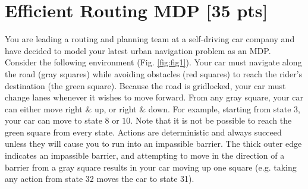 
\section{Efficient Routing MDP [35 pts]}

You are leading a routing and planning team at a self-driving car company and have decided to model your latest urban navigation problem as an MDP. Consider the following environment (Fig. \ref{fig:fig1}). Your car must navigate along the road (gray squares) while avoiding obstacles (red squares) to reach the rider's destination (the green square). Because the road is gridlocked, your car must change lanes whenever it wishes to move forward. From any gray square, your car can either move right $\&$ up, or  right $\&$ down. For example, starting from state $3$, your car can move to state $8$ or $10$. Note that it is not be possible to reach the green square from every state. Actions are deterministic and always succeed unless they will cause you to run into an impassible barrier. The thick outer edge indicates an impassible barrier, and attempting to move in the direction of a barrier from a gray square results in your car moving up one square (e.g. taking any action from state 32 moves the car to state 31). 

